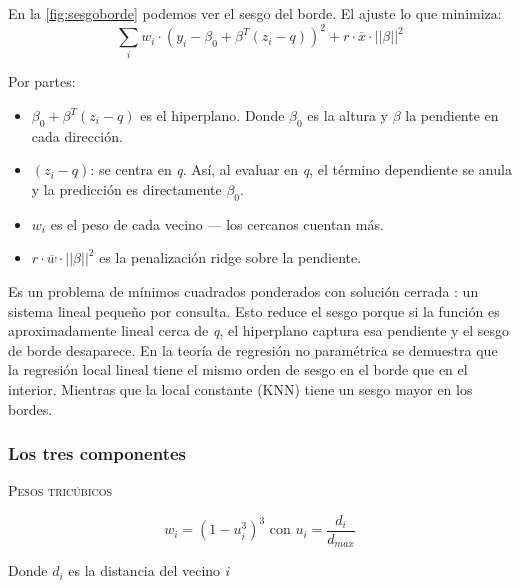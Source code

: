 En la \autoref{fig:sesgoborde} podemos ver el sesgo del borde. El ajuste lo que minimiza: 
$$ 
\sum_{i}w_{i} \cdot (y_{i}-\beta_{0}+\beta^T(z_{i}-q))^2 + r \cdot \overline{x} \cdot || \beta ||^2 
$$

Por partes: 
\begin{itemize}
    \item $\beta_{0}+\beta^T(z_{i}-q)$ es el hiperplano. Donde $\beta_{0}$ es la altura y $\beta$ la pendiente en cada dirección. 
    \item $(z_{i}-q)$: se centra en \textit{q}. Así, al evaluar en \textit{q}, el término dependiente se anula y la predicción es directamente $\beta_{0}$. 
    \item $w_{i}$ es el peso de cada vecino --- los cercanos cuentan más. 
    \item $r\cdot \overline{w}\cdot ||\beta||^2$ es la penalización ridge sobre la pendiente.
\end{itemize}

Es un problema de mínimos cuadrados ponderados con solución cerrada : un sistema lineal pequeño por consulta. Esto reduce el sesgo porque si la función es aproximadamente lineal cerca de \textit{q}, el hiperplano captura esa pendiente y el sesgo de borde desaparece. En la teoría de regresión no paramétrica se demuestra que la regresión local lineal tiene el mismo orden de sesgo en el borde que en el interior. Mientras que la local constante (KNN) tiene un sesgo mayor en los bordes. 

\subsubsection{Los tres componentes}
\textsc{Pesos tricúbicos}

$$ 
w_{i} = (1-u_{i}^3)^3 \text{ con } u_{i} = \frac{d_{i}}{d_{max}}
$$

Donde $d_{i}$ es la distancia del vecino \textit{i} 